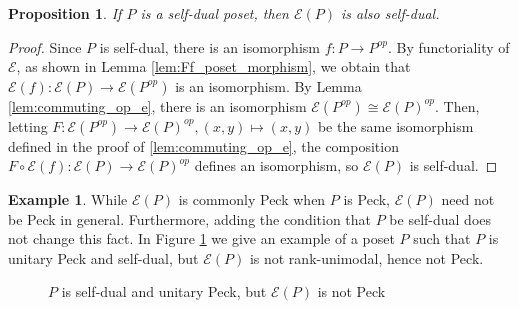 \documentclass[10 pt]{amsart}
\theoremstyle{plain}
\newtheorem{prop}[thm]{Proposition}
\theoremstyle{definition}
\newtheorem{eg}[thm]{Example}
\theoremstyle{remark}
\numberwithin{equation}{section}
\begin{document}
\begin{prop}
\label{prop:self_dual_preservation}
If $P$ is a self-dual poset, then $\mathcal E(P)$ is also self-dual.
\end{prop}
\begin{proof}
Since $P$ is self-dual, there is an isomorphism $f:P \rightarrow P^{op}.$ By functoriality of $\mathcal E$, as shown in Lemma \ref{lem:Ff_poset_morphism}, we obtain that $\mathcal E(f):\mathcal E(P) \rightarrow \mathcal E(P^{op})$ is an isomorphism. By Lemma \ref{lem:commuting_op_e}, there is an isomorphism $\mathcal E(P^{op}) \cong \mathcal E(P)^{op}.$ Then, letting $F:\mathcal E(P^{op}) \rightarrow \mathcal E(P)^{op},(x,y) \mapsto (x,y)$ be the same isomorphism defined in the proof of
\ref{lem:commuting_op_e}, the composition $F\circ \mathcal E(f):\mathcal E(P) \rightarrow \mathcal E(P)^{op}$ defines an isomorphism, so $\mathcal E(P)$ is self-dual.
\end{proof}


\begin{eg}
While $\mathcal{E}(P)$ is commonly Peck when $P$ is Peck, $\mathcal E(P)$ need not be Peck in general.  Furthermore, adding the condition that $P$ be self-dual does not change this fact.  In Figure \ref{fig:dual_not_unimodal} we give an example of a poset $P$ such that $P$ is unitary Peck and self-dual, but $\mathcal{E}(P)$ is not rank-unimodal, hence not Peck.
\end{eg}

\begin{figure}[h]
\label{fig:dual_not_unimodal}

\qquad \hspace{10mm}
\caption{$P$ is self-dual and unitary Peck, but $\mathcal{E}(P)$ is not Peck}
\end{figure}
\end{document}
